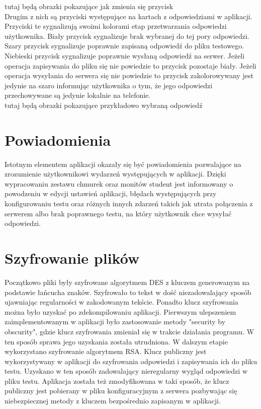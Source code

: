\documentclass{report}
\begin{document}
		tutaj będą obrazki pokazujące jak zmienia się przycisk\\
		
		Drugim z nich są przyciski występujące na kartach z odpowiedziami w aplikacji. Przyciski te sygnalizują swoimi kolorami etap przetwarzania odpowiedzi użytkownika. Biały przycisk sygnalizuje brak wybranej do tej pory odpowiedzi. Szary przycisk sygnalizuje poprawnie zapisaną odpowiedź do pliku testowego. Niebieski przycisk sygnalizuje poprawnie wysłaną odpowiedź na serwer. Jeżeli operacja zapisywania do pliku się nie powiedzie to przycisk pozostaje biały. Jeżeli operacja wysyłania do serwera się nie powiedzie to przycisk zakolorowywany jest jedynie na szaro informując użytkownika o tym, że jego odpowiedzi przechowywane są jedynie lokalnie na telefonie.\\
		
		tutaj będą obrazki pokazujące przykładowo wybraną odpowiedź\\
		
		\section{Powiadomienia}
		
		Istotnym elementem aplikacji okazały się być powiadomienia pozwalające na zrozumienie użytkownikowi wydarzeń występujących w aplikacji. Dzięki wypracowaniu zestawu chmurek oraz monitów student jest informowany o powodzeniu w edycji ustawień aplikacji, błędach występujących przy konfigurowaniu testu oraz różnych innych zdarzeń takich jak utrata połączenia z serwerem albo brak poprawnego testu, na który użytkownik chce wysyłać odpowiedzi.
		
	
		\section{Szyfrowanie plików}
	
		Początkowo pliki były szyfrowane algorytmem DES z kluczem generowanym na podstawie łańcucha znaków. Szyfrowało to tekst w dość niezadowalający sposób ujawniając regularności w zakodowanym tekście. Ponadto klucz szyfrowania można było uzyskać po zdekompilowaniu aplikacji. Pierwszym ulepszeniem zaimplementowanym w aplikacji było zastosowanie metody "security by obscurity", gdzie klucz szyfrowania zmieniał się w trakcie działania programu. W ten sposób sprawa jego uzyskania została utrudniona.
		W dalszym etapie wykorzystano szyfrowanie algorytmem RSA. Klucz publiczny jest wykorzystywany w aplikacji do szyfrowania odpowiedzi i zapisywania ich do pliku testu. Uzyskano w ten sposób zadowalający nieregularny wygląd odpowiedzi w pliku testu. Aplikacja została też zmodyfikowana w taki sposób, że klucz publiczny jest pobierany w pliku konfiguracyjnym z serwera pozbywając się niebezpiecznej metody z kluczem bezpośrednio zapisanym w aplikacji.
	
\end{document}
